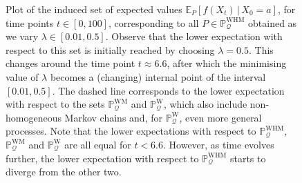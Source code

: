 \documentclass[10pt,a4paper]{paper}
\theoremstyle{definition}
\newcommand{\processes}{\mathbb{P}}
\newcommand{\wprocesses}{\processes^{\mathrm{W}}}
\newcommand{\wmprocesses}{\processes^{\mathrm{WM}}}
\newcommand{\whmprocesses}{\processes^{\mathrm{WHM}}}
\newcommand{\rateset}{\mathcal{Q}}
\begin{document}
\begin{figure}[t]
\caption{Plot of the induced set of expected values $\mathbb{E}_P[f(X_t)\,\vert\,X_0=a]$, for time points $t\in[0,100]$, corresponding to all $P\in\whmprocesses_{\rateset}$ obtained as we vary $\lambda\in[0.01,0.5]$. Observe that the lower expectation with respect to this set is initially reached by choosing $\lambda=0.5$. This changes around the time point $t\approx 6.6$, after which the minimising value of $\lambda$ becomes a (changing) internal point of the interval $[0.01,0.5]$. The dashed line corresponds to the lower expectation with respect to the sets $\wmprocesses_\rateset$ and $\wprocesses_\rateset$, which also include non-homogeneous Markov chains and, for $\wprocesses_\rateset$, even more general processes. Note that the lower expectations with respect to $\whmprocesses_{\rateset}$, $\wmprocesses_{\rateset}$ and $\wprocesses_{\rateset}$ are all equal for $t<6.6$. However, as time evolves further, the lower expectation with respect to $\whmprocesses_{\rateset}$ starts to diverge from the other two.}
\label{fig:homogeneousCounterExample}
\end{figure}
\end{document}
